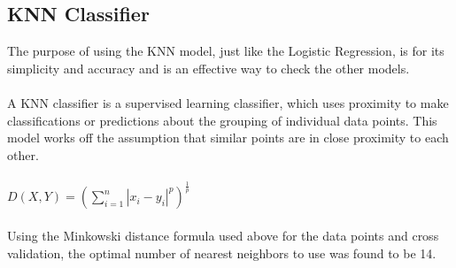 \documentclass[twoside,twocolumn]{article}
\begin{document}
\subsection{KNN Classifier}
The purpose of using the KNN model, just like the Logistic Regression, is for its simplicity and accuracy and is an effective way to check the other models.
\\ \\
A KNN classifier is a supervised learning classifier, which uses proximity to make classifications or predictions about the grouping of individual data points. This model works off the assumption that similar points are in close proximity to each other.
\\ \\
$D(X,Y)=(\sum_{i=1}^{n}|x_i-y_i|^p)^{\frac{1}{p}}$
\\ \\
Using the Minkowski distance formula used above for the data points and cross validation, the optimal number of nearest neighbors to use was found to be 14. 

\end{document}
